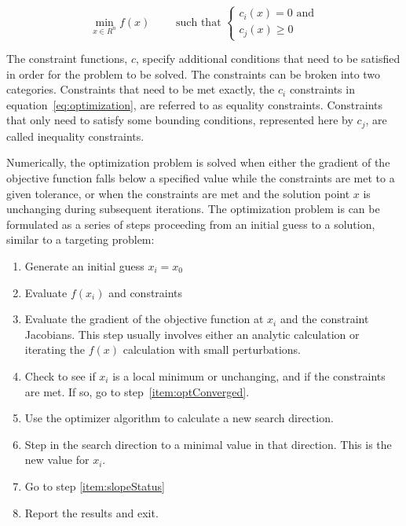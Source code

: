 \begin{equation}\label{eq:optimization}
\min_{x\in R^n} f(x) \quad \quad \text{ such that } \begin{cases}
c_i(x) = 0   \text{ and}\\
c_j(x) \geq 0
\end{cases}
\end{equation}

\noindent The constraint functions, $c$, specify additional conditions that need to be satisfied in
order for the problem to be solved.  The constraints can be broken into two categories.  Constraints
that need to be met exactly, the $c_i$ constraints in equation~\ref{eq:optimization}, are referred
to as equality constraints.  Constraints that only need to satisfy some bounding conditions,
represented here by $c_j$, are called inequality constraints.

Numerically, the optimization problem is solved when either the gradient of the objective function
falls below a specified value while the constraints are met to a given tolerance, or when the
constraints are met and the solution point $x$ is unchanging during subsequent iterations. The
optimization problem is can be formulated as a series of steps proceeding from an initial guess to a
solution, similar to a targeting problem:

\begin{enumerate}
\item Generate an initial guess $x_i = x_0$
\item Evaluate $f(x_i)$ and constraints
\item\label{item:slopeStatus} Evaluate the gradient of the objective function at $x_i$ and the
constraint Jacobians.  This step usually involves either an analytic calculation or iterating the
$f(x)$ calculation with small perturbations.
\item Check to see if $x_i$ is a local minimum or unchanging, and if the constraints are met.  If
so, go to step~\ref{item:optConverged}.
\item Use the optimizer algorithm to calculate a new search direction.
\item Step in the search direction to a minimal value in that direction.  This is the new value
for $x_i$.
\item Go to step \ref{item:slopeStatus}
\item\label{item:optConverged} Report the results and exit.
\end{enumerate}

